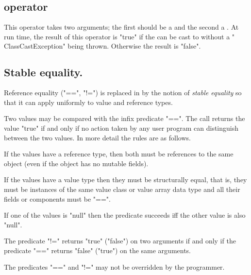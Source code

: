 \subsection{ operator}\label{instanceOf}

This operator takes two arguments; the first should be a
 and the second a
. At run time, the result of this operator is
\xcd"true" if the  can be cast
to  without a \xcd" ClassCastException" being
thrown. Otherwise the result is \xcd"false".

\subsection{Stable equality.}\label{StableEquality}\index{==}\index{!=}

\cbstart
Reference equality (\xcd"==", \xcd"!=") is replaced in \Xten{} by the
notion of {\em stable equality} so that it can apply uniformly to value and
reference types.

Two values may be compared with the infix predicate \xcd"==". The call
returns the value \xcd"true" if and only if no action taken by any
user program can distinguish between the two values.  In more detail
the rules are as follows.

If the values have a reference type, then both must be references to
the same object (even if the object has no mutable fields). 

If the values have a value type then they must be structurally equal,
that is, they must be instances of the same value class or value array
data type and all their fields or components must be \xcd"==". 

If one of the values is \xcd"null" then the predicate succeeds iff the
other value is also \xcd"null".

The predicate \xcd"!=" returns \xcd"true" (\xcd"false") on two
arguments if and only if the predicate \xcd"==" returns \xcd"false"
(\xcd"true") on the same arguments.

The predicates \xcd"==" and \xcd"!=" may not be overridden by the
programmer.

\cbend
